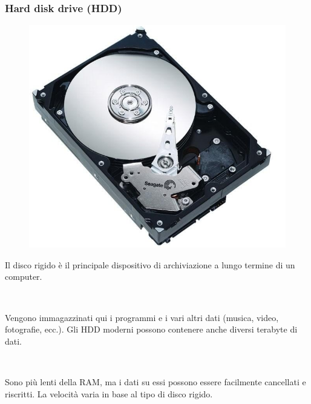 \documentclass[]{beamer}
\begin{document}
\begin{frame}
\frametitle{Hard disk drive (HDD)}
\begin{figure}
  \includegraphics[width=.3\columnwidth]{img/hdd.png}
\end{figure}
Il disco rigido è il principale \alert<1>{dispositivo di archiviazione} a lungo termine di un computer.\pause

~

Vengono immagazzinati qui i programmi e i vari altri dati (musica, video, fotografie, ecc.). Gli HDD moderni possono contenere anche diversi terabyte di dati. \pause

~

Sono più lenti della RAM, ma i dati su essi possono essere facilmente cancellati e riscritti. La velocità varia in base al tipo di disco rigido.
\end{frame}
\end{document}
